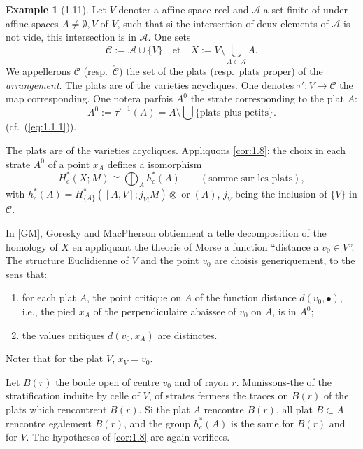 \documentclass[11pt,a4paper]{article}
\theoremstyle{plain}
\theoremstyle{definition}
\newtheorem{example}[theorem]{Example}
\newcommand{\ori}{\operatorname{or}}
\begin{document}
\begin{example}[1.11]\label{ex:1.11}
Let $V$ denoter a affine space reel and $\mathcal{A}$ a set finite of under-affine spaces $A \neq \emptyset, V$ of $V$, such that si the intersection of deux elements of $\mathcal{A}$ is not vide, this intersection is in $\mathcal{A}$. One sets
\[\mathcal{C} := \mathcal{A} \cup \{V\} \quad \text{et} \quad X := V \setminus \bigcup_{A \in \mathcal{A}} A.\]
We appellerons $\mathcal{C}$ (resp.~$\mathring{\mathcal{C}}$) the set of the plats (resp.~plats proper) of the \emph{arrangement}. The plats are of the varieties acycliques. One denotes $\tau': V \to \mathcal{C}$ the map corresponding. One notera parfois $A^0$ the strate corresponding to the plat $A$:
\begin{equation}\label{eq:1.11.1}
A^0 := \tau'^{-1}(A) = A \setminus \bigcup\{\text{plats plus petits}\}.
\tag{1.11.1}
\end{equation}
(cf.~(\ref{eq:1.1.1})).

The plats are of the varieties acycliques. Appliquons \ref{cor:1.8}: the choix in each strate $A^0$ of a point $x_A$ defines a isomorphism
\begin{equation}\label{eq:1.11.2}
H^*_c(X;M) \cong \bigoplus_A h^*_c(A) \qquad (\text{somme sur les plats}),
\tag{1.11.2}
\end{equation}
with $h^*_c(A) = H^*_{\{A\}}([A,V];j_{V!}M) \otimes \ori(A)$, $j_V$ being the inclusion of $\{V\}$ in $\mathcal{C}$.

In [GM], Goresky and MacPherson obtiennent a telle decomposition of the homology of $X$ en appliquant the theorie of Morse a function ``distance a $v_0 \in V$''. The structure Euclidienne of $V$ and the point $v_0$ are choisis generiquement, to the sens that:
\begin{enumerate}[label=(\alph*)]
\item for each plat $A$, the point critique on $A$ of the function distance $d(v_0,\bullet)$, i.e., the pied $x_A$ of the perpendiculaire abaissee of $v_0$ on $A$, is in $A^0$;
\item the values critiques $d(v_0,x_A)$ are distinctes.
\end{enumerate}
Noter that for the plat $V$, $x_V = v_0$.

Let $B(r)$ the boule open of centre $v_0$ and of rayon $r$. Munissons-the of the stratification induite by celle of $V$, of strates fermees the traces on $B(r)$ of the plats which rencontrent $B(r)$. Si the plat $A$ rencontre $B(r)$, all plat $B \subset A$ rencontre egalement $B(r)$, and the group $h^*_c(A)$ is the same for $B(r)$ and for $V$. The hypotheses of \ref{cor:1.8} are again verifiees.


\end{example}
\end{document}
